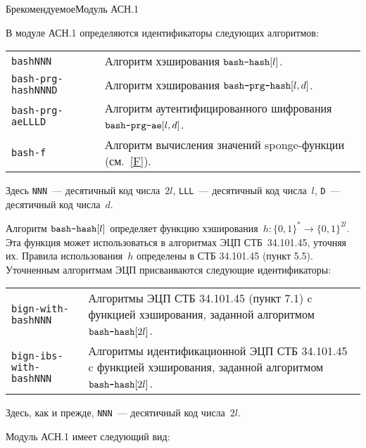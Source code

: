 \begin{appendix}{Б}{рекомендуемое}{Модуль АСН.1}
\label{ASN}

\mbox{}

В модуле АСН.1 определяются идентификаторы следующих алгоритмов:
\begin{center}
\begin{tabular}{p{3.6cm}p{12.7cm}}
\texttt{bashNNN} &
Алгоритм хэширования $\texttt{bash-hash}[l]$.\\
%
\texttt{bash-prg-hashNNND} &
Алгоритм хэширования $\texttt{bash-prg-hash}[l,d]$.\\
%
\texttt{bash-prg-aeLLLD} &
Алгоритм аутентифицированного шифрования $\texttt{bash-prg-ae}[l,d]$.\\
%
\texttt{bash-f}  &
Алгоритм вычисления значений sponge-функции (см.~\ref{F}).\\
\end{tabular}
\end{center}

Здесь \texttt{NNN}~--- десятичный код числа~$2l$, 
\texttt{LLL}~--- десятичный код числа~$l$, 
\texttt{D}~--- десятичный код числа~$d$.

Алгоритм $\texttt{bash-hash}[l]$ определяет функцию 
хэширования~$h\colon \{0,1\}^*\to\{0,1\}^{2l}$. 
Эта функция может использоваться в алгоритмах 
ЭЦП СТБ~34.101.45, уточняя их.
%
Правила использования~$h$ определены в СТБ 34.101.45 (пункт 5.5).
%
Уточненным алгоритмам ЭЦП присваиваются следующие идентификаторы:
\begin{center}
\begin{tabular}{p{4.4cm}p{12.0cm}}
\texttt{bign-with-bashNNN} &
Алгоритмы ЭЦП СТБ 34.101.45 (пункт 7.1)
c функцией хэширования, заданной алгоритмом~$\texttt{bash-hash}[2l]$.\\
%
\texttt{bign-ibs-with-bashNNN} &
Алгоритмы идентификационной ЭЦП СТБ 34.101.45
c функцией хэширования, заданной алгоритмом~$\texttt{bash-hash}[2l]$.\\
\end{tabular}
\end{center}

Здесь, как и прежде, \texttt{NNN}~--- десятичный код числа~$2l$.

Модуль АСН.1 имеет следующий вид:



\end{appendix}
